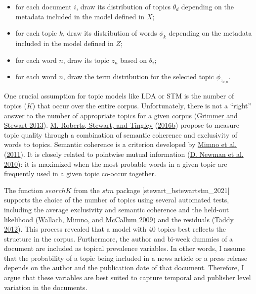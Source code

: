 \documentclass[
]{article}
\providecommand{\tightlist}{%
  \setlength{\itemsep}{0pt}\setlength{\parskip}{0pt}}
\begin{document}
\begin{itemize}
\tightlist
\item
  for each document \(i\), draw its distribution of topics \(\theta_d\)
  depending on the metadata included in the model defined in \(X\);
\item
  for each topic \(k\), draw its distribution of words \(\phi_k\)
  depending on the metadata included in the model defined in \(Z\);
\item
  for each word \(n\), draw its topic \(z_n\) based on \(\theta_i\);
\item
  for each word \(n\), draw the term distribution for the selected topic
  \(\phi_{z_{d,n}}\).
\end{itemize}

One crucial assumption for topic models like LDA or STM is the number of
topics (\(K\)) that occur over the entire corpus. Unfortunately, there
is not a ``right'' answer to the number of appropriate topics for a
given corpus (\protect\hyperlink{ref-grimmer_text_2013}{Grimmer and
Stewart 2013}). \protect\hyperlink{ref-roberts_stm:_2016}{M. Roberts,
Stewart, and Tingley} (\protect\hyperlink{ref-roberts_stm:_2016}{2016b})
propose to measure topic quality through a combination of semantic
coherence and exclusivity of words to topics. Semantic coherence is a
criterion developed by
\protect\hyperlink{ref-mimno_optimizing_2011}{Mimno et al.}
(\protect\hyperlink{ref-mimno_optimizing_2011}{2011}). It is closely
related to pointwise mutual information
(\protect\hyperlink{ref-newman_automatic_2010}{D. Newman et al. 2010}):
it is maximized when the most probable words in a given topic are
frequently used in a given topic co-occur together.

The function \(searchK\) from the \(stm\) package
{[}stewart\_bstewartstm\_2021{]} supports the choice of the number of
topics using several automated tests, including the average exclusivity
and semantic coherence and the held-out likelihood
(\protect\hyperlink{ref-wallach_rethinking_2009}{Wallach, Mimno, and
McCallum 2009}) and the residuals
(\protect\hyperlink{ref-taddy_estimation_2012}{Taddy 2012}). This
process revealed that a model with 40 topics best reflects the structure
in the corpus. Furthermore, the author and bi-week dummies of a document
are included as topical prevalence variables. In other words, I assume
that the probability of a topic being included in a news article or a
press release depends on the author and the publication date of that
document. Therefore, I argue that these variables are best suited to
capture temporal and publisher level variation in the documents.
\end{document}
